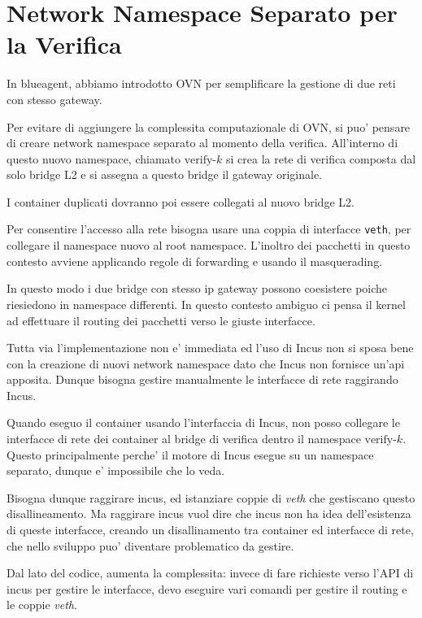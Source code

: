 \section{Network Namespace Separato per la
Verifica}\label{network-namespace-separato-per-la-verifica}

In blueagent, abbiamo introdotto OVN per semplificare la gestione di due
reti con stesso gateway.

Per evitare di aggiungere la complessita computazionale di OVN, si puo'
pensare di creare network namespace separato al momento della verifica.
All'interno di questo nuovo namespace, chiamato \(\text{verify-}k\) si
crea la rete di verifica composta dal solo bridge L2 e si assegna a
questo bridge il gateway originale.

I container duplicati dovranno poi essere collegati al nuovo bridge L2.

Per consentire l'accesso alla rete bisogna usare una coppia di
interfacce \passthrough{\lstinline!veth!}, per collegare il namespace
nuovo al root namespace. L'inoltro dei pacchetti in questo contesto
avviene applicando regole di forwarding e usando il masquerading.

In questo modo i due bridge con stesso ip gateway possono coesistere
poiche riesiedono in namespace differenti. In questo contesto ambiguo ci
pensa il kernel ad effettuare il routing dei pacchetti verso le giuste
interfacce.

Tutta via l'implementazione non e' immediata ed l'uso di Incus non si
sposa bene con la creazione di nuovi network namespace dato che Incus
non fornisce un'api apposita. Dunque bisogna gestire manualmente le
interfacce di rete raggirando Incus.

Quando eseguo il container usando l'interfaccia di Incus, non posso
collegare le interfacce di rete dei container al bridge di verifica
dentro il namespace \(\text{verify-}k\). Questo principalmente perche'
il motore di Incus esegue su un namespace separato, dunque e'
impossibile che lo veda.

Bisogna dunque raggirare incus, ed istanziare coppie di \emph{veth} che
gestiscano questo disallineamento. Ma raggirare incus vuol dire che
incus non ha idea dell'esistenza di queste interfacce, creando un
disallinamento tra container ed interfacce di rete, che nello sviluppo
puo' diventare problematico da gestire.

Dal lato del codice, aumenta la complessita: invece di fare richieste
verso l'API di incus per gestire le interfacce, devo eseguire vari
comandi per gestire il routing e le coppie \emph{veth}.

